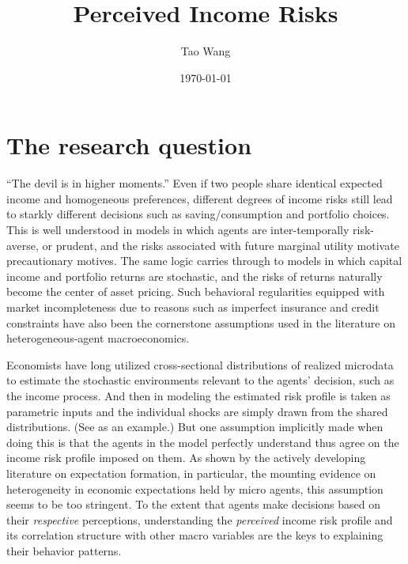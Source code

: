 \documentclass[12pt,notitlepage,onecolumn,aps,pra]{article}
\begin{document}
    
    
    \title{Perceived Income Risks}\author{Tao Wang}

\date{\today}
\maketitle


    
    

    
    \hypertarget{the-research-question}{%
\section{The research question}\label{the-research-question}}

``The devil is in higher moments.'' Even if two people share identical
expected income and homogeneous preferences, different degrees of income
risks still lead to starkly different decisions such as
saving/consumption and portfolio choices. This is well understood in
models in which agents are inter-temporally risk-averse, or prudent, and
the risks associated with future marginal utility motivate precautionary
motives. The same logic carries through to models in which capital
income and portfolio returns are stochastic, and the risks of returns
naturally become the center of asset pricing. Such behavioral
regularities equipped with market incompleteness due to reasons such as
imperfect insurance and credit constraints have also been the
cornerstone assumptions used in the literature on heterogeneous-agent
macroeconomics.

Economists have long utilized cross-sectional distributions of realized
microdata to estimate the stochastic environments relevant to the
agents' decision, such as the income process. And then in modeling the
estimated risk profile is taken as parametric inputs and the individual
shocks are simply drawn from the shared distributions. (See
\cite{blundell_consumption_2008} as an example.) But one assumption
implicitly made when doing this is that the agents in the model
perfectly understand thus agree on the income risk profile imposed on
them. As shown by the actively developing literature on expectation
formation, in particular, the mounting evidence on heterogeneity in
economic expectations held by micro agents, this assumption seems to be
too stringent. To the extent that agents make decisions based on their
\emph{respective} perceptions, understanding the \emph{perceived} income
risk profile and its correlation structure with other macro variables
are the keys to explaining their behavior patterns.
\end{document}
